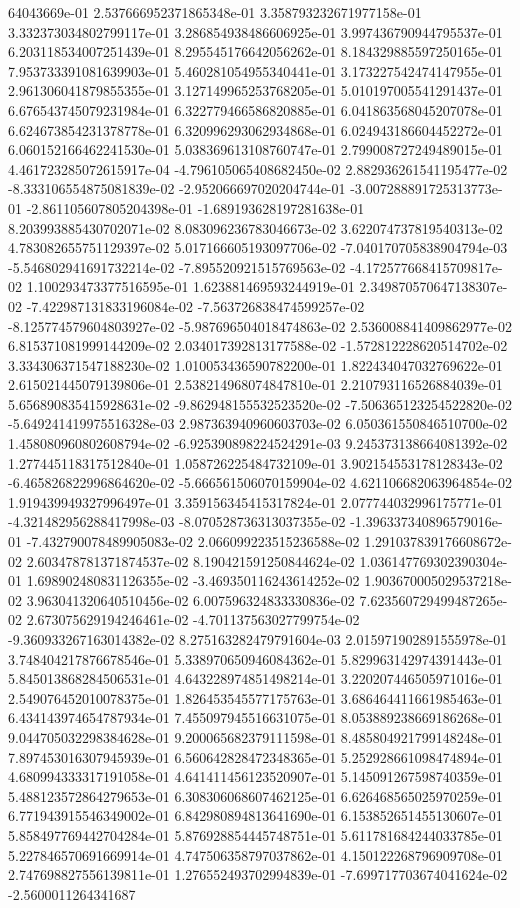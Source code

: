 64043669e-01	2.537666952371865348e-01	3.358793232671977158e-01	3.332373034802799117e-01	3.286854938486606925e-01	3.997436790944795537e-01	6.203118534007251439e-01	8.295545176642056262e-01	8.184329885597250165e-01	7.953733391081639903e-01	5.460281054955340441e-01	3.173227542474147955e-01	2.961306041879855355e-01	3.127149965253768205e-01	5.010197005541291437e-01	6.676543745079231984e-01	6.322779466586820885e-01	6.041863568045207078e-01	6.624673854231378778e-01	6.320996293062934868e-01	6.024943186604452272e-01	6.060152166462241530e-01	5.038369613108760747e-01	2.799008727249489015e-01	4.461723285072615917e-04	-4.796105065408682450e-02	2.882936261541195477e-02	-8.333106554875081839e-02	-2.952066697020204744e-01	-3.007288891725313773e-01	-2.861105607805204398e-01	-1.689193628197281638e-01	8.203993885430702071e-02	8.083096236783046673e-02	3.622074737819540313e-02	4.783082655751129397e-02	5.017166605193097706e-02	-7.040170705838904794e-03	-5.546802941691732214e-02	-7.895520921515769563e-02	-4.172577668415709817e-02	1.100293473377516595e-01	1.623881469593244919e-01	2.349870570647138307e-02	-7.422987131833196084e-02	-7.563726838474599257e-02	-8.125774579604803927e-02	-5.987696504018474863e-02	2.536008841409862977e-02	6.815371081999144209e-02	2.034017392813177588e-02	-1.572812228620514702e-02	3.334306371547188230e-02	1.010053436590782200e-01	1.822434047032769622e-01	2.615021445079139806e-01	2.538214968074847810e-01	2.210793116526884039e-01	5.656890835415928631e-02	-9.862948155532523520e-02	-7.506365123254522820e-02	-5.649241419975516328e-03	2.987363940960603703e-02	6.050361550846510700e-02	1.458080960802608794e-02	-6.925390898224524291e-03	9.245373138664081392e-02	1.277445118317512840e-01	1.058726225484732109e-01	3.902154553178128343e-02	-6.465826822996864620e-02	-5.666561506070159904e-02	4.621106682063964854e-02	1.919439949327996497e-01	3.359156345415317824e-01	2.077744032996175771e-01	-4.321482956288417998e-03	-8.070528736313037355e-02	-1.396337340896579016e-01	-7.432790078489905083e-02	2.066099223515236588e-02	1.291037839176608672e-02	2.603478781371874537e-02	8.190421591250844624e-02	1.036147769302390304e-01	1.698902480831126355e-02	-3.469350116243614252e-02	1.903670005029537218e-02	3.963041320640510456e-02	6.007596324833330836e-02	7.623560729499487265e-02	2.673075629194246461e-02	-4.701137563027799754e-02	-9.360933267163014382e-02	8.275163282479791604e-03	2.015971902891555978e-01	3.748404217876678546e-01	5.338970650946084362e-01	5.829963142974391443e-01	5.845013868284506531e-01	4.643228974851498214e-01	3.220207446505971016e-01	2.549076452010078375e-01	1.826453545577175763e-01	3.686464411661985463e-01	6.434143974654787934e-01	7.455097945516631075e-01	8.053889238669186268e-01	9.044705032298384628e-01	9.200065682379111598e-01	8.485804921799148248e-01	7.897453016307945939e-01	6.560642828472348365e-01	5.252928661098474894e-01	4.680994333317191058e-01	4.641411456123520907e-01	5.145091267598740359e-01	5.488123572864279653e-01	6.308306068607462125e-01	6.626468565025970259e-01	6.771943915546349002e-01	6.842980894813641690e-01	6.153852651455130607e-01	5.858497769442704284e-01	5.876928854445748751e-01	5.611781684244033785e-01	5.227846570691669914e-01	4.747506358797037862e-01	4.150122268796909708e-01	2.747698827556139811e-01	1.276552493702994839e-01	-7.699717703674041624e-02	-2.5600011264341687